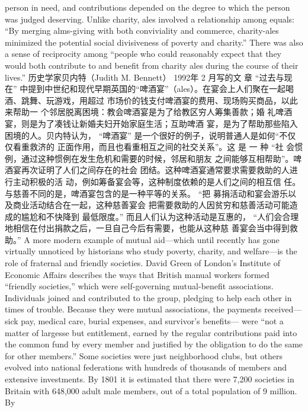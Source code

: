 \begin{paracol}{2}
person in need, and contributions depended on the degree to
which the person was judged deserving. Unlike charity, ales involved a relationship among equals: ``By merging alms-giving
with both conviviality and commerce, charity-ales minimized the potential social divisiveness of poverty and charity.'' There
was also a sense of reciprocity among ``people who could reasonably expect that they would both contribute to and benefit
from charity ales during the course of their lives.''
\switchcolumn
历史学家贝内特（Judith M. Bennett） 1992年 2 月写的文
章 “过去与现在” 中提到中世纪和现代早期英国的“啤酒宴”（ales）。在宴会上人们聚在一起喝酒、跳舞、玩游戏，用超过
市场价的钱支付啤酒宴的费用、现场购买商品，以此来帮助一
个邻居脱离困境：教会啤酒宴是为了给教区穷人筹集善款；婚
礼啤酒宴，则是为了凑钱让新婚夫妇开始家庭生活；互助啤酒
宴，是为了帮助那些陷入困境的人。贝内特认为， “啤酒宴”
是一个很好的例子，说明普通人是如何“不仅仅看重救济的
正面作用，而且也看重相互之间的社交关系”。这 是 一 种 “社
会惯例，通过这种惯例在发生危机和需要的时候，邻居和朋友
之间能够互相帮助”。啤酒宴再次证明了人们之间存在的社会
团结。这种啤酒宴通常要求需要救助的人进行主动积极的活
动，例如筹备宴会等，这种制度依赖的是人们之间的相互信
任。与慈善不同的是，啤酒宴包含的是一种平等的关系。 “把
募捐活动和宴会游乐以及商业活动结合在一起，这种慈善宴会
把需要救助的人因贫穷和慈善活动可能造成的尴尬和不快降到
最低限度。” 而且人们认为这种活动是互惠的， “人们会合理
地相信在付出捐款之后，一旦自己今后有需要，也能从这种慈
善宴会当中得到救助。”
\switchcolumn*
A more modern example of mutual aid---which until recently has gone virtually unnoticed by historians who study
poverty, charity, and welfare---is the role of fraternal and
friendly societies. David Green of London's Institute of Economic Affairs describes the ways that British manual workers
formed ``friendly societies,'' which were self-governing mutual-benefit associations. Individuals joined and contributed to the
group, pledging to help each other in times of trouble. Because
they were mutual associations, the payments received---sick
pay, medical care, burial expenses, and survivor's benefits---
were ``not a matter of largesse but entitlement, earned by the
regular contributions paid into the common fund by every
member and justified by the obligation to do the same for other
members.'' Some societies were just neighborhood clubs, but
others evolved into national federations with hundreds of thousands of members and extensive investments. By 1801 it is estimated that there were 7,200 societies in Britain with 648,000
adult male members, out of a total population of 9 million. By

\end{paracol}

